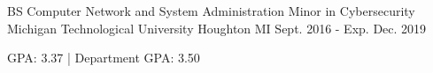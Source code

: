 

\begin{cventries}

  \cventry
    {BS Computer Network and System Administration Minor in Cybersecurity} %
    {Michigan Technological University} %
    {Houghton MI} %
    {Sept. 2016 - Exp. Dec. 2019} %
    {
      \begin{cvitems} %
        \item {GPA: 3.37  |  Department GPA: 3.50}
      \end{cvitems}
    }

\end{cventries}
